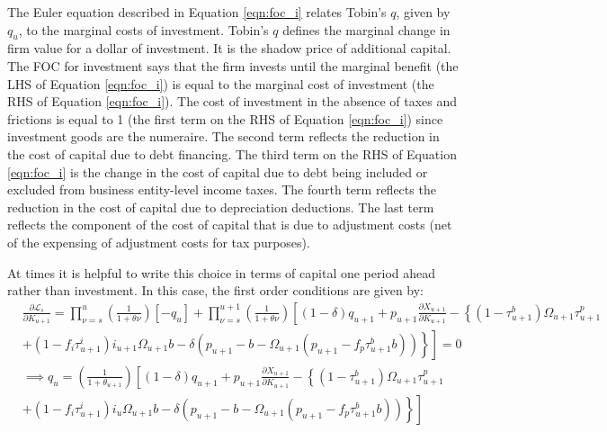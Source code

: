 \noindent\noindent The Euler equation described in Equation \ref{eqn:foc_i} relates Tobin's $q$, given by $q_{u}$, to the marginal costs of investment.  Tobin's $q$ defines the marginal change in firm value for a dollar of investment. It is the shadow price of additional capital.  The FOC for investment says that the firm invests until the marginal benefit (the LHS of Equation \ref{eqn:foc_i}) is equal to the marginal cost of investment (the RHS of Equation \ref{eqn:foc_i}).  The cost of investment in the absence of taxes and frictions is equal to 1 (the first term on the RHS of Equation \ref{eqn:foc_i}) since investment goods are the numeraire.  The second term reflects the reduction in the cost of capital due to debt financing.  The third term on the RHS of Equation \ref{eqn:foc_i} is the change in the cost of capital due to debt being included or excluded from business entity-level income taxes.  The fourth term reflects the reduction in the cost of capital due to depreciation deductions.  The last term reflects the component of the cost of capital that is due to adjustment costs (net of the expensing of adjustment costs for tax purposes).



At times it is helpful to write this choice in terms of capital one period ahead rather than investment.  In this case, the first order conditions are given by:
 \begin{equation}
\label{eqn:foc_k}
\begin{split}
& \frac{\partial \mathcal{L}_{s}}{\partial K_{u+1}}  =  \prod_{\nu=s}^{u}\left(\frac{1}{1+\theta{\nu}}\right)\left[-q_{u}\right]  +  \prod_{\nu=s}^{u+1} \left(\frac{1}{1+\theta{\nu}}\right)\left[(1-\delta)q_{u+1} +p_{u+1} \frac{\partial X_{u+1}}{\partial K_{u+1}}- \left\{(1-\tau^{b}_{u+1})\Omega_{u+1}\tau^{p}_{u+1} \right.\right. \\
 &\left.\left.+(1-f_{i}\tau^{i}_{u+1})i_{u+1}\Omega_{u+1}b-\delta(p_{u+1}-b-\Omega_{u+1}(p_{u+1}-f_{p}\tau^{b}_{u+1}b))\right\}   \right] = 0 \\
& \implies  q_{u}  = \left(\frac{1}{1+\theta_{u+1}}\right) \left[(1-\delta)q_{u+1} +p_{u+1} \frac{\partial X_{u+1}}{\partial K_{u+1}}- \left\{(1-\tau^{b}_{u+1})\Omega_{u+1}\tau^{p}_{u+1} \right.\right. \\
&\left.\left.+(1-f_{i}\tau^{i}_{u+1})i_{u}\Omega_{u+1}b-\delta(p_{u+1}-b-\Omega_{u+1}(p_{u+1}-f_{p}\tau^{b}_{u+1}b))\right\}   \right]  \\
\end{split}
\end{equation}

